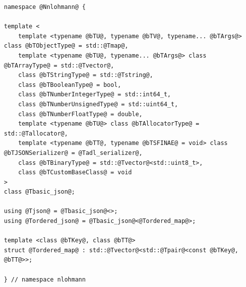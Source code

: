 \documentclass{slides}
\makeatletter
\newcommand{\@slidetitle}{}
\newcommand{\slidetitle}[1]{\renewcommand{\@slidetitle}{#1}}
\makeatother
\begin{document}
\break
\slidetitle{\ttfamily nlohmann/json}

{\fontsize{12pt}{16pt}\selectfont
\begin{lstlisting}
namespace @Nnlohmann@ {

template <
    template <typename @bTU@, typename @bTV@, typename... @bTArgs@> class @bTObjectType@ = std::@Tmap@,
    template <typename @bTU@, typename... @bTArgs@> class @bTArrayType@ = std::@Tvector@,
    class @bTStringType@ = std::@Tstring@,
    class @bTBooleanType@ = bool,
    class @bTNumberIntegerType@ = std::int64_t,
    class @bTNumberUnsignedType@ = std::uint64_t,
    class @bTNumberFloatType@ = double,
    template <typename @bTU@> class @bTAllocatorType@ = std::@Tallocator@,
    template <typename @bTT@, typename @bTSFINAE@ = void> class @bTJSONSerializer@ = @Tadl_serializer@,
    class @bTBinaryType@ = std::@Tvector@<std::uint8_t>,
    class @bTCustomBaseClass@ = void
>
class @Tbasic_json@;

using @Tjson@ = @Tbasic_json@<>;
using @Tordered_json@ = @Tbasic_json@<@Tordered_map@>;

template <class @bTKey@, class @bTT@>
struct @Tordered_map@ : std::@Tvector@<std::@Tpair@<const @bTKey@, @bTT@>>;

} // namespace nlohmann
\end{lstlisting}
}

\break
\slidetitle{Parsing}
\end{document}
